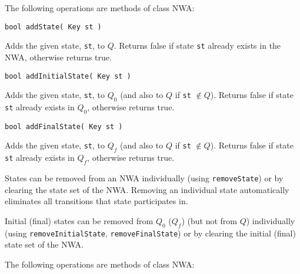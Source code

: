 \noindent The following operations are methods of class NWA:

\begin{description}

  \item\texttt{bool addState( Key st )} \nopagebreak

    Adds the given state, \texttt{st}, to $Q$.  Returns false if state
    \texttt{st} already exists in the NWA, otherwise returns true.

  \item\texttt{bool addInitialState( Key st )} \nopagebreak

    Adds the given state, \texttt{st}, to $Q_0 $ (and also to $Q$ if
    \texttt{st} $\not\in Q$).  Returns false if state \texttt{st} already
    exists in $Q_0$, otherwise returns true.

  \item\texttt{bool addFinalState( Key st )} \nopagebreak

    Adds the given state, \texttt{st}, to $Q_f$ (and also to $Q$ if
    \texttt{st} $\not\in Q$).  Returns false if state \texttt{st} already
    exists in $Q_f$, otherwise returns true.

\end{description}


States can be removed from an NWA individually (using \texttt{removeState})
or by clearing the state set of the NWA. 
Removing an individual state automatically eliminates all transitions that
state participates in.

Initial (final) states can be removed from $Q_0 $ ($Q_f$) (but not from $Q$)
individually (using \texttt{removeInitialState}, \texttt{removeFinalState})
or by clearing the initial (final) state set of the NWA.

\noindent The following operations are methods of class NWA:

